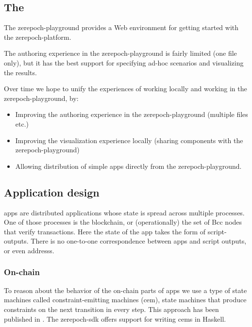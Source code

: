 \subsection{The }
\label{sec:zerepoch-playground}

The \gls{zerepoch-playground} provides a Web environment for getting started with the \gls{zerepoch-platform}.

The authoring experience in the \gls{zerepoch-playground} is fairly limited (one file only), but it has the best support for specifying ad-hoc scenarios and visualizing the results.

Over time we hope to unify the experiences of working locally and working in the \gls{zerepoch-playground}, by:
\begin{itemize}
\item Improving the authoring experience in the \gls{zerepoch-playground} (multiple files etc.)
\item Improving the visualization experience locally (sharing components with the \gls{zerepoch-playground})
\item Allowing distribution of simple \glspl{app} directly from the \gls{zerepoch-playground}.
\end{itemize}

\subsection{Application design}
\label{sec:application-design}


\glspl{app} are distributed applications whose state is spread across multiple processes.
One of those processes is the blockchain, or (operationally) the set of Bcc \glspl{node} that verify transactions.
Here the state of the \gls{app} takes the form of \glspl{script-output}.
There is no one-to-one correspondence between \glspl{app} and script outputs, or even \glspl{address}.

\subsubsection{On-chain}

To reason about the behavior of the on-chain parts of \glspl{app} we use a type of state machines called constraint-emitting machines (\gls{cem}), state machines that produce constraints on the next transition in every step.
This approach has been published in \cite{DBLP:conf/isola/Chakravarty0MMM20a}.
The \gls{zerepoch-sdk} offers support for writing \glspl{cem} in Haskell.

